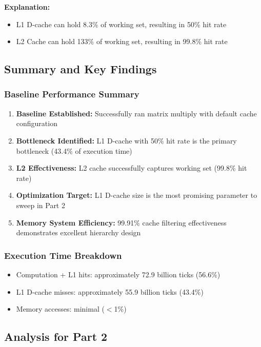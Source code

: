 \documentclass[11pt,a4paper]{article}
\begin{document}
\textbf{Explanation:}
\begin{itemize}[noitemsep]
    \item L1 D-cache can hold 8.3\% of working set, resulting in 50\% hit rate
    \item L2 Cache can hold 133\% of working set, resulting in 99.8\% hit rate
\end{itemize}

\subsection{Summary and Key Findings}

\subsubsection{Baseline Performance Summary}

\begin{enumerate}[noitemsep]
    \item \textbf{Baseline Established:} Successfully ran matrix multiply with default cache configuration
    \item \textbf{Bottleneck Identified:} L1 D-cache with 50\% hit rate is the primary bottleneck (43.4\% of execution time)
    \item \textbf{L2 Effectiveness:} L2 cache successfully captures working set (99.8\% hit rate)
    \item \textbf{Optimization Target:} L1 D-cache size is the most promising parameter to sweep in Part 2
    \item \textbf{Memory System Efficiency:} 99.91\% cache filtering effectiveness demonstrates excellent hierarchy design
\end{enumerate}

\subsubsection{Execution Time Breakdown}
\begin{itemize}[noitemsep]
    \item Computation + L1 hits: approximately 72.9 billion ticks (56.6\%)
    \item L1 D-cache misses: approximately 55.9 billion ticks (43.4\%)
    \item Memory accesses: minimal ($<$1\%)
\end{itemize}

\subsection{Analysis for Part 2}
\end{document}
